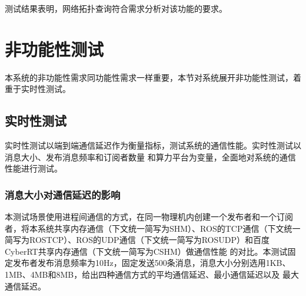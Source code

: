 测试结果表明，网络拓扑查询符合需求分析对该功能的要求。

\section{非功能性测试}
本系统的非功能性需求同功能性需求一样重要，本节对系统展开非功能性测试，着重于实时性测试。

\subsection{实时性测试}
实时性测试以端到端通信延迟作为衡量指标，测试系统的通信性能。实时性测试以消息大小、发布消息频率和订阅者数量
和算力平台为变量，全面地对系统的通信性能进行测试。
\subsubsection{消息大小对通信延迟的影响}
本测试场景使用进程间通信的方式，在同一物理机内创建一个发布者和一个订阅者，将本系统共享内存通信（下文统一简写为SHM）、ROS的TCP通信（下文统一简写为ROSTCP）、ROS的UDP通信（下文统一简写为ROSUDP）和百度CyberRT共享内存通信（下文统一简写为CSHM）做通信性能
的对比。本测试固定发布者发布消息频率为10Hz，固定发送500条消息，消息大小分别选用1KB、1MB、4MB和8MB，给出四种通信方式的平均通信延迟、最小通信延迟以及
最大通信延迟。

